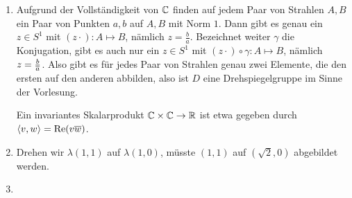 \documentclass{article}
\begin{document}
	\begin{enumerate}
		\item[1.1 - \tbf{4}] 
		
		Aufgrund der Vollständigkeit von $\mathbb{C}$ finden auf jedem Paar von Strahlen $A,B$ ein Paar von Punkten $a,b$ auf $A,B$ mit Norm $1$. Dann gibt es genau ein $z \in S^1$ mit $(z\cdot) : A \mapsto B$, nämlich $z = \frac{b}{a}$. Bezeichnet weiter $\gamma$ die Konjugation, gibt es auch nur ein $z \in S^1$ mit $(z \cdot) \circ \gamma : A \mapsto B$, nämlich $z = \frac{b}{\overline{{a}}}$. Also gibt es für jedes Paar von Strahlen genau zwei Elemente, die den ersten auf den anderen abbilden, also ist $D$ eine Drehspiegelgruppe im Sinne der Vorlesung.
		
		Ein invariantes Skalarprodukt $ \mathbb{C} \times \mathbb{C} \to \mathbb{R}$ ist etwa gegeben durch $\left\langle v, w \right\rangle = \Re(v \overline{{w}})$.
		\item[2.1 - \tbf{4}]
		
		Drehen wir $\lambda(1,1)$ auf $\lambda(1,0)$, müsste $(1,1)$ auf $(\sqrt 2, 0)$ abgebildet werden.
		\item[1.2 - \tbf{3}] 
		

\end{enumerate}
\end{document}
